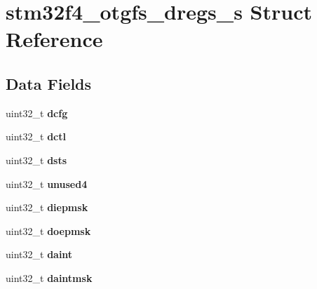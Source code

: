 \hypertarget{structstm32f4__otgfs__dregs__s}{}\section{stm32f4\+\_\+otgfs\+\_\+dregs\+\_\+s Struct Reference}
\label{structstm32f4__otgfs__dregs__s}
\subsection*{Data Fields}
\begin{DoxyCompactItemize}
\item 
\mbox{\label{structstm32f4__otgfs__dregs__s_a8f20da8543e82285d7370b7536295fdd}} 
uint32\+\_\+t {\bfseries dcfg}
\item 
\mbox{\label{structstm32f4__otgfs__dregs__s_a6632e328860f87b0259e963efff5c963}} 
uint32\+\_\+t {\bfseries dctl}
\item 
\mbox{\label{structstm32f4__otgfs__dregs__s_a3cfc04420d1c14961f1863f4d0f08a88}} 
uint32\+\_\+t {\bfseries dsts}
\item 
\mbox{\label{structstm32f4__otgfs__dregs__s_af590dd4f50979a07060b06c738cf728c}} 
uint32\+\_\+t {\bfseries unused4}
\item 
\mbox{\label{structstm32f4__otgfs__dregs__s_a71c7d379d0b8038b3f25dd68e067baf4}} 
uint32\+\_\+t {\bfseries diepmsk}
\item 
\mbox{\label{structstm32f4__otgfs__dregs__s_a72ddeae56d5725104c06bffe097c440d}} 
uint32\+\_\+t {\bfseries doepmsk}
\item 
\mbox{\label{structstm32f4__otgfs__dregs__s_ab5704c0557690a37fcf9ad801ca42615}} 
uint32\+\_\+t {\bfseries daint}
\item 
\mbox{\label{structstm32f4__otgfs__dregs__s_aafa6646e6803a68baa34665871910df2}} 
uint32\+\_\+t {\bfseries daintmsk}
\item 
\mbox{\label{structstm32f4__otgfs__dregs__s_af87e32c70209b23681c80f3cbb213baf}} 

\end{DoxyCompactItemize}

